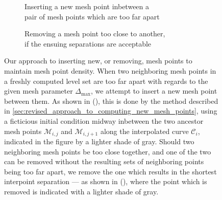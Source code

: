 \begin{figure}[htpb]
    \centering
    \begin{subfigure}[b]{0.475\textwidth}
        \centering
        \resizebox{0.9\linewidth}{!}%
        {}
        \caption[]{{\small Inserting a new mesh point inbetween a
        \\\phantom{(a)} pair of mesh points which are too far apart}}
        \label{fig:mesh_management_pure_insertion}
    \end{subfigure}
    \begin{subfigure}[b]{0.475\textwidth}
        \centering
        \resizebox{0.9\linewidth}{!}%
        {}
        \caption[]{{\small Removing a mesh point too close to another,
        \\\phantom{(b)} if the ensuing separations are acceptable}}
        \label{fig:mesh_management_pure_deletion}
    \end{subfigure}
    \caption[Our approach to inserting new, or removing, mesh points to
    maintain mesh point density]
    {Our approach to inserting new, or removing, mesh points to maintain
        mesh point density. When two neighboring mesh points in a freshly
        computed level set are too far apart with regards to the given mesh
        parameter $\Delta_{\max}$, we attempt to insert a new mesh point
        between them. As shown in
        (), this is done by
        the method described in
        \cref{sec:revised_approach_to_computing_new_mesh_points}, using a
        ficticious initial condition midway inbetween the two ancestor mesh
        points $\mathcal{M}_{i,j}$ and $\mathcal{M}_{i,j+1}$ along the
        interpolated curve $\mathcal{C}_{i}$, indicated in the figure by
        a lighter shade of gray. Should two neighboring mesh points
        be too close together, and one of the two can be removed without the
        resulting sets of neighboring points being too far apart, we remove
        the one which results in the shortest interpoint separation --- as
        shown in (), where the point
        which is removed is indicated with a lighter shade of gray.
    }
    \label{fig:mesh_management_insertion_and_deletion}
\end{figure}

